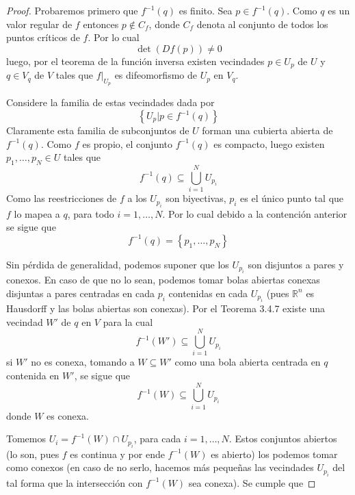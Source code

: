 \documentclass[12pt]{report}
\theoremstyle{largebreak}
\begin{document}
\begin{proof}
    Probaremos primero que $f^{-1}(q)$ es finito. Sea $p\in f^{-1}(q)$. Como $q$ es un valor regular de $f$ entonces $p\notin C_f$, donde $C_f$ denota al conjunto de todos los puntos críticos de $f$. Por lo cual
    \begin{equation*}
        \det(Df(p))\neq0
    \end{equation*}
    luego, por el teorema de la función inversa existen vecindades $p\in U_p$ de $U$ y $q\in V_q$ de $V$ tales que $f|_{U_p}$ es difeomorfismo de $U_p$ en $V_q$.

    Considere la familia de estas vecindades dada por
    \begin{equation*}
        \left\{U_p|p\in f^{-1}(q)\right\}
    \end{equation*}
    Claramente esta familia de subconjuntos de $U$ forman una cubierta abierta de $f^{-1}(q)$. Como $f$ es propio, el conjunto $f^{-1}(q)$ es compacto, luego existen $p_1,\dots,p_N\in U$ tales que
    \begin{equation*}
        f^{-1}(q)\subseteq\bigcup_{i=1}^{N}U_{p_i}
    \end{equation*}
    Como las reestricciones de $f$ a los $U_{p_i}$ son biyectivas, $p_i$ es el único punto tal que $f$ lo mapea a $q$, para todo $i=1,\dots,N$. Por lo cual debido a la contención anterior se sigue que
    \begin{equation*}
        f^{-1}(q)=\left\{p_1,\dots,p_N\right\}
    \end{equation*}
    
    Sin pérdida de generalidad, podemos suponer que los $U_{p_i}$ son disjuntos a pares y conexos. En caso de que no lo sean, podemos tomar bolas abiertas conexas disjuntas a pares centradas en cada $p_i$ contenidas en cada $U_{p_i}$ (pues $\mathbb{R}^n$ es Hausdorff y las bolas abiertas son conexas). Por el Teorema 3.4.7 existe una vecindad $W'$ de $q$ en $V$ para la cual
    \begin{equation*}
        f^{-1}(W')\subseteq\bigcup_{i=1}^{N}U_{p_i}
    \end{equation*}
    si $W'$ no es conexa, tomando a $W\subseteq W'$ como una bola abierta centrada en $q$ contenida en $W'$, se sigue que
    \begin{equation*}
        f^{-1}(W)\subseteq\bigcup_{i=1}^{N}U_{p_i}
    \end{equation*}
    donde $W$ es conexa.

    Tomemos $U_i=f^{-1}(W)\cap U_{p_i}$, para cada $i=1,\dots,N$. Estos conjuntos abiertos (lo son, pues $f$ es continua y por ende $f^{-1}(W)$ es abierto) los podemos tomar como conexos (en caso de no serlo, hacemos más pequeñas las vecindades $U_{p_i}$ del tal forma que la intersección con $f^{-1}(W)$ sea conexa). Se cumple que


\end{proof}
\end{document}
